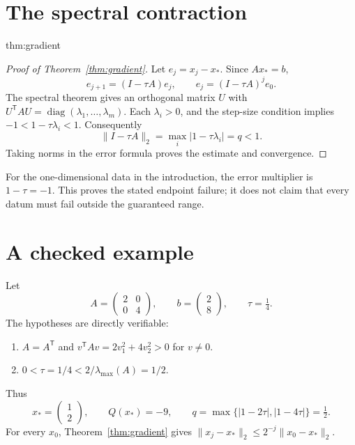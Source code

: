 \documentclass[12pt,reqno]{amsart}
\begin{document}
\section{The spectral contraction}\label{sec:contraction}
\begin{theoremrecall}{thm:gradient}

\end{theoremrecall}
\begin{proof}[Proof of Theorem~\ref{thm:gradient}]
Let $e_j=x_j-x_*$. Since $Ax_*=b$,
\[
e_{j+1}=(I-\tau A)e_j,\qquad e_j=(I-\tau A)^j e_0.
\]
The spectral theorem gives an orthogonal matrix $U$ with
$U^{\mathsf T}AU=\operatorname{diag}(\lambda_1,\ldots,\lambda_m)$.
Each $\lambda_i>0$, and the step-size condition implies
$-1<1-\tau\lambda_i<1$. Consequently
\[
\|I-\tau A\|_2=\max_i|1-\tau\lambda_i|=q<1.
\]
Taking norms in the error formula proves the estimate and convergence.
\end{proof}
For the one-dimensional data in the introduction, the error multiplier is
$1-\tau=-1$. This proves the stated endpoint failure; it does not claim
that every datum must fail outside the guaranteed range.

\section{A checked example}\label{sec:example}
Let
\[
A=\begin{pmatrix}2&0\\0&4\end{pmatrix},\qquad
b=\begin{pmatrix}2\\8\end{pmatrix},\qquad \tau=\tfrac14.
\]
The hypotheses are directly verifiable:
\begin{enumerate}
\item $A=A^{\mathsf T}$ and $v^{\mathsf T}Av=2v_1^2+4v_2^2>0$ for $v\ne0$.
\item $0<\tau=1/4<2/\lambda_{\max}(A)=1/2$.
\end{enumerate}
Thus
\[
x_*=\begin{pmatrix}1\\2\end{pmatrix},\qquad Q(x_*)=-9,\qquad
q=\max\{|1-2\tau|,|1-4\tau|\}=\tfrac12.
\]
For every $x_0$, Theorem~\ref{thm:gradient} gives
$\|x_j-x_*\|_2\leq2^{-j}\|x_0-x_*\|_2$.
\end{document}
